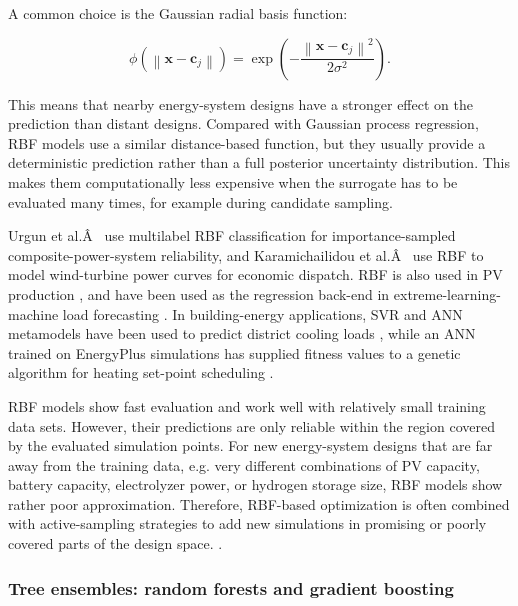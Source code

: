 \documentclass[final,5p,times,twocolumn]{elsarticle}
\begin{document}
A common choice is the Gaussian radial basis function:

$$\begin{equation}
 \phi\left(\left\| \mathbf{x} - \mathbf{c}_j \right\|\right) = \exp\left( -\frac{\left\| \mathbf{x} - \mathbf{c}_j \right\|^2}{2\sigma^2} \right).
\end{equation}$$

This means that nearby energy-system designs have a stronger effect on
the prediction than distant designs. Compared with Gaussian process
regression, RBF models use a similar distance-based function, but they
usually provide a deterministic prediction rather than a full posterior
uncertainty distribution. This makes them computationally less expensive
when the surrogate has to be evaluated many times, for example during
candidate sampling.

Urgun et al.Â~\cite{Urgun20202791} use multilabel RBF classification for
importance-sampled composite-power-system reliability, and
Karamichailidou et al.Â~\cite{Karamichailidou20212137} use RBF to model
wind-turbine power curves for economic dispatch. RBF is also used in PV
production \cite{Yang2020415,Tian2020}, and have been used as the
regression back-end in extreme-learning-machine load forecasting
\cite{Zeng2017175,Sideratos2020,Madhukumar20228891,Rafi202132436}. In
building-energy applications, SVR and ANN metamodels have been used to
predict district cooling loads \cite{Jia2022553}, while an ANN trained on
EnergyPlus simulations has supplied fitness values to a genetic
algorithm for heating set-point scheduling \cite{Reynolds2017704}.

RBF models show fast evaluation and work well with relatively small
training data sets. However, their predictions are only reliable within
the region covered by the evaluated simulation points. For new
energy-system designs that are far away from the training data, e.g.
very different combinations of PV capacity, battery capacity,
electrolyzer power, or hydrogen storage size, RBF models show rather
poor approximation. Therefore, RBF-based optimization is often combined
with active-sampling strategies to add new simulations in promising or
poorly covered parts of the design space.
\cite{Deng2020831,Tian2020,Han2018622,Pang2023}.

\subsubsection{Tree ensembles: random forests and gradient boosting}
\label{sec:tax:trees}
\end{document}
